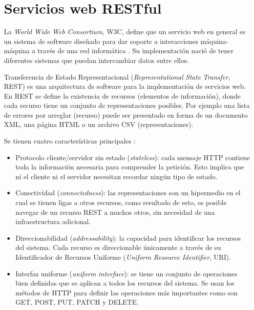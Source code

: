 \section{Servicios web RESTful}
La \textit{World Wide Web Consortium}, W3C, define que un servicio web
en general es un sistema de software diseñado para dar soporte a interacciones
máquina-máquina a través de una red informática \cite{17_w3c_webservice}.
Su implementación nació de tener diferentes sistemas que puedan intercambiar
datos entre ellos.

Transferencia de Estado Representacional (\textit{Representational State Transfer}, REST)
es una arquitectura de software para la implementación de servicios web.
En REST se define la existencia de recursos (elementos de información), donde
cada recurso tiene un conjunto de representaciones posibles.
Por ejemplo una lista de errores por arreglar (recurso) puede ser presentado en
forma de un documento XML, una página HTML o un archivo CSV (representaciones).

\vspace{2.5mm}

Se tienen cuatro características principales \cite{1_richardson_2007}:

\begin{itemize}
\item Protocolo cliente/servidor sin estado (\textit{stateless}): cada mensaje
  HTTP contiene toda la información necesaria para comprender la petición.
  Esto implica que ni el cliente ni el servidor necesitan recordar ningún
  tipo de estado.
\item Conectividad (\textit{connectedness}): las representaciones son un hipermedio
  en el cual se tienen ligas a otros recursos, como resultado de esto, es posible
  navegar de un recurso REST a muchos otros, sin necesidad de una
  infraestructura adicional.
\item Direccionabilidad (\textit{addressability}): la capacidad para
  identificar los recursos del sistema. Cada recurso es direccionable únicamente
  a través de su Identificador de Recursos Uniforme (\textit{Uniform Resource Identifier}, URI).
\item Interfaz uniforme (\textit{uniform interface}): se tiene un conjunto de
  operaciones bien definidas que se aplican a todos los recursos del sistema.
  Se usan los métodos de HTTP para definir las operaciones más importantes
  como son GET, POST, PUT, PATCH y DELETE.
\end{itemize}

